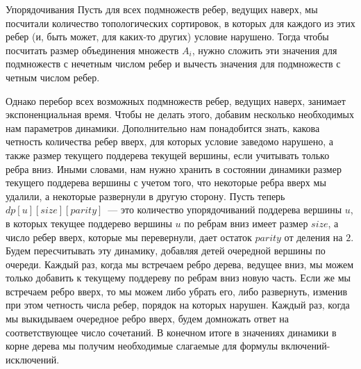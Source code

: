 \begin{tutorial}{Упорядочивания}
Пусть для всех подмножеств ребер, ведущих наверх, мы посчитали количество топологических сортировок, в которых для каждого из этих ребер (и, быть может, для каких-то других) условие нарушено. Тогда чтобы посчитать размер объединения множеств $A_i$, нужно сложить эти значения для подмножеств с нечетным числом ребер и вычесть значения для подмножеств с четным числом ребер.

Однако перебор всех возможных подмножеств ребер, ведущих наверх, занимает экспоненциальная время. Чтобы не делать этого, добавим несколько необходимых нам параметров динамики. Дополнительно нам понадобится знать, какова четность количества ребер вверх, для которых условие заведомо нарушено, а также размер текущего поддерева текущей вершины, если учитывать только ребра вниз. Иными словами, нам нужно хранить в состоянии динамики размер текущего поддерева вершины с учетом того, что некоторые ребра вверх мы удалили, а некоторые развернули в другую сторону. Пусть теперь $dp[u][size][parity]$~--- это количество упорядочиваний поддерева вершины $u$, в которых текущее поддерево вершины $u$ по ребрам вниз имеет размер $size$, а число ребер вверх, которые мы перевернули, дает остаток $parity$ от деления на $2$. Будем пересчитывать эту динамику, добавляя детей очередной вершины по очереди. Каждый раз, когда мы встречаем ребро дерева, ведущее вниз, мы можем только добавить к текущему поддереву по ребрам вниз новую часть. Если же мы встречаем ребро вверх, то мы можем либо убрать его, либо развернуть, изменив при этом четность числа ребер, порядок на которых нарушен. Каждый раз, когда мы выкидываем очередное ребро вверх, будем домножать ответ на соответствующее число сочетаний. В конечном итоге в значениях динамики в корне дерева мы получим необходимые слагаемые для формулы включений-исключений.

\end{tutorial}
